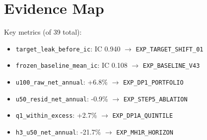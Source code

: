 \section{Evidence Map}
Key metrics (of 39 total):
\begin{itemize}
    \item \texttt{target\_leak\_before\_ic}: IC 0.940 $\to$ \texttt{EXP\_TARGET\_SHIFT\_01}
    \item \texttt{frozen\_baseline\_mean\_ic}: IC 0.108 $\to$ \texttt{EXP\_BASELINE\_V43}
    \item \texttt{u100\_raw\_net\_annual}: +6.8\% $\to$ \texttt{EXP\_DP1\_PORTFOLIO}
    \item \texttt{u50\_resid\_net\_annual}: -0.9\% $\to$ \texttt{EXP\_STEP5\_ABLATION}
    \item \texttt{q1\_within\_excess}: +2.7\% $\to$ \texttt{EXP\_DP1A\_QUINTILE}
    \item \texttt{h3\_u50\_net\_annual}: -21.7\% $\to$ \texttt{EXP\_MH1R\_HORIZON}
\end{itemize}
